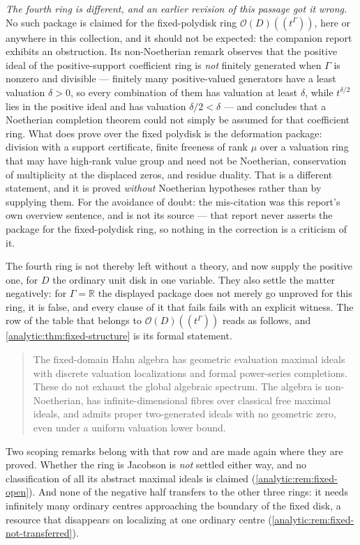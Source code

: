 \documentclass[11pt,letterpaper]{article}
\theoremstyle{definition}
\theoremstyle{remark}
\newcommand{\R}{\mathbb R}
\newcommand{\OO}{\mathcal O}
\numberwithin{equation}{section}
\begin{document}
\emph{The fourth ring is different, and an earlier revision of this passage
got it wrong.}  No such package is claimed for the fixed-polydisk ring
$\OO(D)((t^\Gamma))$, here or anywhere in this collection, and it should not
be expected: the companion report
\cite{FiniteDeformations} exhibits an obstruction.  Its
non-Noetherian remark observes that the positive ideal of the
positive-support coefficient ring is \emph{not} finitely generated when
$\Gamma$ is nonzero and divisible --- finitely many positive-valued
generators have a least valuation $\delta>0$, so every combination of them has
valuation at least $\delta$, while $t^{\delta/2}$ lies in the positive ideal
and has valuation $\delta/2<\delta$ --- and concludes that a Noetherian
completion theorem could not simply be assumed for that coefficient ring.  What
\cite{FiniteDeformations} does prove over the fixed polydisk is the
deformation package: division with a support certificate, finite freeness of
rank $\mu$ over a valuation ring that may have high-rank value group and need
not be Noetherian, conservation of multiplicity at the displaced zeros, and
residue duality.  That is a different statement, and it is proved \emph{without}
Noetherian hypotheses rather than by supplying them.  For the avoidance of
doubt: the mis-citation was this report's own overview sentence, and
\cite{FiniteDeformations} is not its source --- that report never asserts the
package for the fixed-polydisk ring, so nothing in the correction is a
criticism of it.

The fourth ring is not thereby left without a theory, and
 now
supply the positive one, for $D$ the ordinary unit disk in one variable.
They also settle the matter negatively: for $\Gamma=\R$ the displayed
package does not merely go unproved for this ring, it is false, and every
clause of it that fails fails with an explicit witness. The
row of the table that belongs to $\OO(D)((t^\Gamma))$ reads as follows, and
\cref{analytic:thm:fixed-structure} is its formal statement.
\begin{quote}
The fixed-domain Hahn algebra has geometric evaluation maximal ideals with
discrete valuation localizations and formal power-series completions. These
do not exhaust the global algebraic spectrum. The algebra is non-Noetherian,
has infinite-dimensional fibres over classical free maximal ideals, and
admits proper two-generated ideals with no geometric zero, even under a
uniform valuation lower bound.
\end{quote}
Two scoping remarks belong with that row and are made again where they are
proved. Whether the ring is Jacobson is \emph{not} settled either way, and no
classification of all its abstract maximal ideals is claimed
(\cref{analytic:rem:fixed-open}). And none of the negative half transfers to
the other three rings: it needs infinitely many ordinary centres approaching
the boundary of the fixed disk, a resource that disappears on localizing at
one ordinary centre (\cref{analytic:rem:fixed-not-transferred}).
\end{document}
